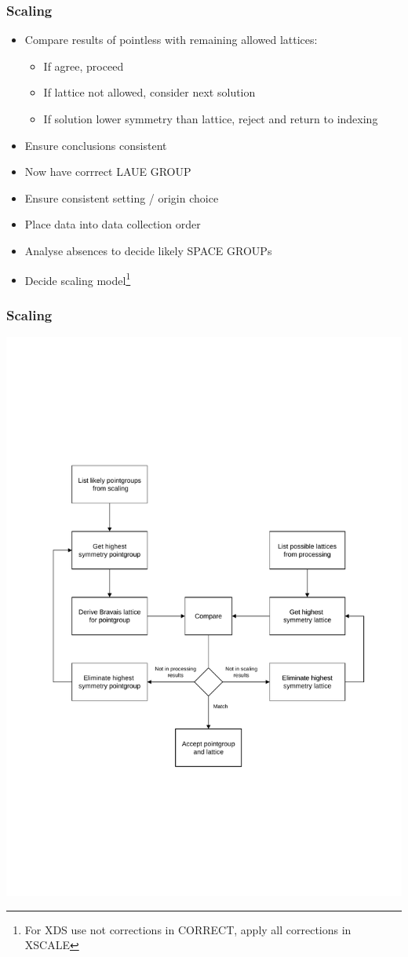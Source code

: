 \documentclass[slides,compress]{beamer}
\begin{document}
\begin{frame}
\frametitle{Scaling}
\begin{itemize}
\item{Compare results of pointless with remaining allowed lattices:
\begin{itemize}
\item{If agree, proceed}
\item{If lattice not allowed, consider next solution}
\item{If solution lower symmetry than lattice, reject and return to indexing}
\end{itemize}
}
\item{Ensure conclusions consistent}
\item{Now have corrrect LAUE GROUP}
\item{Ensure consistent setting / origin choice}
\item{Place data into data collection order}
\item{Analyse absences to decide likely SPACE GROUPs}
\item{Decide scaling model\footnote{For XDS use not corrections in CORRECT,
apply all corrections in XSCALE}}
\end{itemize}
\end{frame}

\begin{frame}
\frametitle{Scaling}
\hspace{2cm}
\includegraphics[scale=0.5]{figures/scaling-step-1.pdf}
\end{frame}
\end{document}
